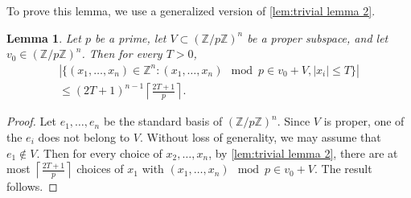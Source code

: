 \documentclass[12pt, a4paper]{amsart}
\numberwithin{equation}{section}
\newtheorem{lemma}[theorem]{Lemma}
\theoremstyle{definition}
\newcommand{\Z}{\mathbb{Z}}
\begin{document}
To prove this lemma, we use a generalized version of \cref{lem:trivial lemma 2}.
\begin{lemma}\label{lem:counting mod p}
	Let $p$ be a prime, let $V\subset (\Z/p\Z)^n$ be a proper subspace, and let $v_0\in (\Z/p\Z)^{n}$.
	Then for every $T>0$,
	\begin{align*}
	\left|\{(x_1,\ldots,x_n)\in \Z^n : (x_1,\ldots,x_n) \mod p \in v_0+V, |x_i|\le T\}\right|\\
	\le (2T+1)^{n-1}\left\lceil \frac{2T+1}{p}\right\rceil.
	\end{align*}
\end{lemma}
\begin{proof}
	Let $e_1,\ldots,e_{n}$ be the standard basis of $(\Z/p\Z)^{n}$. Since $V$ is proper, one of the $e_i$ does not belong to $V$.  
	Without loss of generality, we may assume that $e_1\notin V$. Then for every choice of $x_2,\ldots,x_{n}$, by \cref{lem:trivial lemma 2}, there are at most $\left\lceil \frac{2T+1}{p}\right\rceil$ choices of $x_1$ with $(x_1,\ldots,x_n) \mod p \in v_0+V$. The result follows.
\end{proof}
\end{document}
